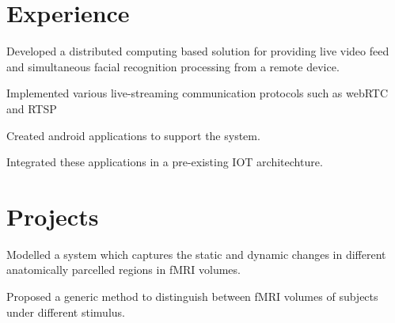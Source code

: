 \documentclass[]{myCV}
\begin{document}
%
%

%
%

%
%

\begin{minipage}[t]{0.6\textwidth}


\section{Experience}
\vspace{\topsep} 
\begin{tightemize}
\item Developed a distributed computing based solution for providing live video feed and simultaneous facial recognition processing from a remote device.
\item Implemented various live-streaming communication protocols such as webRTC and RTSP
\item Created android applications to support the system.
\item Integrated these applications in a pre-existing IOT architechture.
\end{tightemize}
\sectionsep


\section{Projects}
\descript{}
\begin{tightemize}
\item Modelled a system which captures the static and dynamic changes in different anatomically parcelled regions in fMRI volumes. 
\item Proposed a generic method to distinguish between fMRI volumes of subjects under different stimulus.
\end{tightemize}
\sectionsep


\end{minipage}
\end{document}
